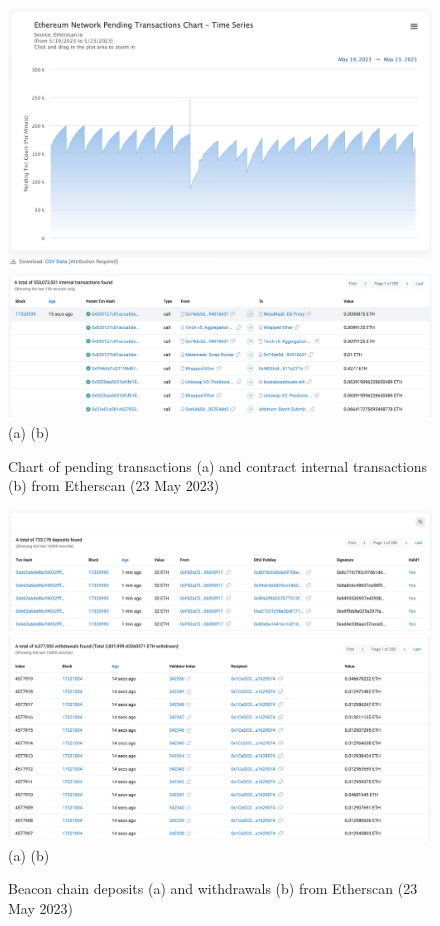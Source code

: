 \documentclass[UTF8]{article}
\begin{document}
{\begin{figure}[htbp]
\begin{center}
\includegraphics[width=0.48\linewidth]{images/pendchart}
\includegraphics[width=0.48\linewidth]{images/internal} \\
(a)\hspace{160pt}        (b)\\
\caption{Chart of pending transactions (a) and contract internal transactions (b) from Etherscan (23 May 2023)}
\label{fig:pendchart}
\end{center}
\end{figure}

\begin{figure}[htbp]
\begin{center}
\includegraphics[width=0.48\linewidth]{images/deposits}
\includegraphics[width=0.48\linewidth]{images/withdrawals} \\
(a)\hspace{160pt}        (b)\\
\caption{Beacon chain deposits (a) and withdrawals (b) from Etherscan (23 May 2023)}
\label{fig:deposits}
\end{center}
\end{figure}

}
\end{document}
